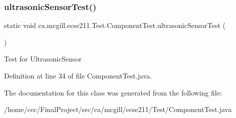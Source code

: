 \subsubsection{\texorpdfstring{ultrasonic\+Sensor\+Test()}{ultrasonicSensorTest()}}
{\footnotesize\ttfamily static void ca.\+mcgill.\+ecse211.\+Test.\+Component\+Test.\+ultrasonic\+Sensor\+Test (\begin{DoxyParamCaption}{ }\end{DoxyParamCaption})\hspace{0.3cm}{\ttfamily [static]}}

Test for Ultrasonic\+Sensor 

Definition at line 34 of file Component\+Test.\+java.



The documentation for this class was generated from the following file\+:\begin{DoxyCompactItemize}
\item 
/home/ccc/\+Final\+Project/src/ca/mcgill/ecse211/\+Test/Component\+Test.\+java\end{DoxyCompactItemize}
